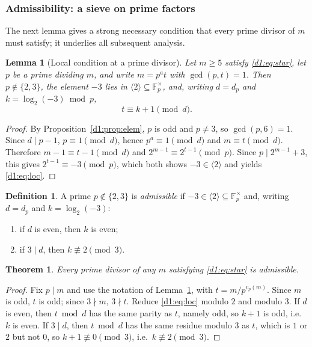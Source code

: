 \documentclass[a4paper]{article}
\theoremstyle{plain}
\newtheorem{theorem}{Theorem}[subsection]
\newtheorem{lemma}{Lemma}[subsection]
\theoremstyle{definition}
\newtheorem{definition}{Definition}[subsection]
\theoremstyle{remark}
\newcommand{\F}{\mathbb{F}}
\newcommand{\gen}[1]{\langle #1 \rangle}
\begin{document}
\subsubsection{Admissibility: a sieve on prime factors}\label{d1:sec:sieve}

The next lemma gives a strong necessary condition that every prime divisor of $m$ must satisfy;
it underlies all subsequent analysis.

\begin{lemma}[Local condition at a prime divisor]\label{d1:lem:local}
Let $m\ge 5$ satisfy \eqref{d1:eq:star}, let $p$ be a prime dividing $m$, and write $m=p^{a}t$ with
$\gcd(p,t)=1$. Then $p\notin\{2,3\}$, the element $-3$ lies in $\gen{2}\subseteq\F_{p}^{\times}$,
and, writing $d=d_{p}$ and $k=\log_{2}(-3)\bmod p$,
\begin{equation}\label{d1:eq:loc}
t\equiv k+1\pmod{d}.
\end{equation}
\end{lemma}

\begin{proof}
By Proposition~\ref{d1:prop:elem}, $p$ is odd and $p\ne 3$, so $\gcd(p,6)=1$. Since $d\mid p-1$,
$p\equiv 1\pmod d$, hence $p^{a}\equiv 1\pmod d$ and $m\equiv t\pmod d$. Therefore
$m-1\equiv t-1\pmod d$ and $2^{m-1}\equiv 2^{t-1}\pmod p$. Since $p\mid 2^{m-1}+3$, this gives
$2^{t-1}\equiv-3\pmod p$, which both shows $-3\in\gen{2}$ and yields \eqref{d1:eq:loc}.
\end{proof}

\begin{definition}\label{d1:def:adm}
A prime $p\notin\{2,3\}$ is \emph{admissible} if $-3\in\gen{2}\subseteq\F_{p}^{\times}$ and,
writing $d=d_{p}$ and $k=\log_{2}(-3)$:
\begin{enumerate}[label=\textup{(\Alph*)}]
\item if $d$ is even, then $k$ is even;
\item if $3\mid d$, then $k\not\equiv 2\pmod 3$.
\end{enumerate}
\end{definition}

\begin{theorem}\label{d1:thm:adm}
Every prime divisor of any $m$ satisfying \eqref{d1:eq:star} is admissible.
\end{theorem}

\begin{proof}
Fix $p\mid m$ and use the notation of Lemma~\ref{d1:lem:local}, with $t=m/p^{v_{p}(m)}$. Since $m$
is odd, $t$ is odd; since $3\nmid m$, $3\nmid t$. Reduce \eqref{d1:eq:loc} modulo $2$ and modulo
$3$. If $d$ is even, then $t\bmod d$ has the same parity as $t$, namely odd, so $k+1$ is odd,
i.e.\ $k$ is even. If $3\mid d$, then $t\bmod d$ has the same residue modulo $3$ as $t$, which is
$1$ or $2$ but not $0$, so $k+1\not\equiv 0\pmod 3$, i.e.\ $k\not\equiv 2\pmod 3$.
\end{proof}
\end{document}
